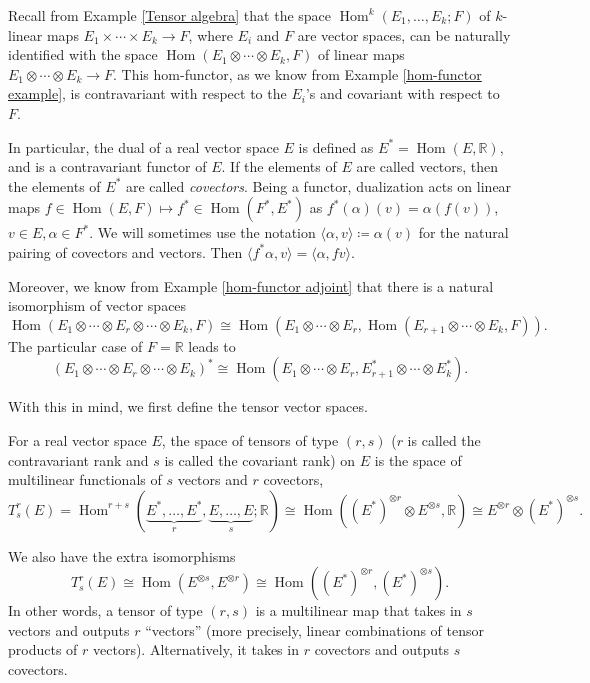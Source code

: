 \documentclass[english,letterpaper]{article}%
\numberwithin{equation}{section}
\numberwithin{figure}{section}
\numberwithin{table}{section}
\theoremstyle{definition}
\theoremstyle{definition}
\theoremstyle{definition}
\theoremstyle{plain}
\theoremstyle{plain}
\theoremstyle{plain}
\theoremstyle{plain}
\theoremstyle{remark}
\theoremstyle{remark}
\DeclareMathOperator{\Hom}{Hom}
\begin{document}
Recall from Example \ref{Tensor algebra} that the space $\Hom^k(E_1,\ldots,E_k;F)$ of $k$-linear maps $E_1\times \cdots\times E_k\to F$, where $E_i$ and $F$ are vector spaces, can be naturally identified with the space $\Hom(E_1\otimes\cdots\otimes E_k,F)$ of linear maps $E_1\otimes \cdots\otimes E_k\to F$. This hom-functor, as we know from Example \ref{hom-functor example}, is contravariant with respect to the $E_i$'s and covariant with respect to $F$. 

In particular, the dual of a real vector space $E$ is defined as $E^\ast=\Hom(E,\mathbb{R})$, and is a contravariant functor of $E$. If the elements of $E$ are called vectors, then the elements of $E^\ast$ are called \emph{covectors}. Being a functor, dualization acts on linear maps $f\in\Hom(E,F)\mapsto f^\ast\in \Hom(F^\ast,E^\ast)$ as $f^\ast(\alpha)(v)=\alpha(f(v))$, $v\in E, \alpha\in F^\ast$. We will sometimes use the notation $\langle \alpha,v\rangle\coloneqq\alpha(v)$ for the natural pairing of covectors and vectors. Then  $\langle f^\ast \alpha,v\rangle=\langle \alpha,fv\rangle$.

Moreover, we know from Example \ref{hom-functor adjoint} that there is a natural isomorphism of vector spaces
\[
\Hom(E_1\otimes\cdots\otimes E_r\otimes\cdots\otimes E_k,F)\cong\Hom\left(E_1\otimes\cdots\otimes E_r,\Hom(E_{r+1}\otimes\cdots\otimes E_k,F)\right).
\]
The particular case of $F=\mathbb{R}$ leads to 
\[
(E_1\otimes\cdots\otimes E_r\otimes\cdots\otimes E_k)^\ast\cong\Hom(E_1\otimes\cdots\otimes E_r,E_{r+1}^\ast\otimes\cdots\otimes E_k^\ast).
\]

With this in mind, we first define the tensor vector spaces.

\begin{defn}[Tensors]
    For a real vector space $E$, the space of tensors of type $(r,s)$ ($r$ is called the contravariant rank and $s$ is called the covariant rank) on $E$ is the space of multilinear functionals of $s$ vectors and $r$ covectors, \[T^r_s(E)=\Hom^{r+s}(\underbrace{E^\ast,\ldots,E^\ast}_{r},\underbrace{E,\ldots,E}_s;\mathbb{R})\cong\Hom \left(\left(E^\ast\right)^{\otimes r}\otimes E^{\otimes s},\mathbb{R}\right)\cong E^{\otimes r}\otimes \left(E^\ast\right)^{\otimes s}.\]
\end{defn}

We also have the extra isomorphisms
\[
T^r_s(E)\cong \Hom(E^{\otimes s},E^{\otimes r})\cong \Hom\left(\left(E^\ast\right)^{\otimes r},\left(E^\ast\right)^{\otimes s}\right).
\]
In other words, a tensor of type $(r,s)$ is a multilinear map that takes in $s$ vectors and outputs $r$ ``vectors'' (more precisely, linear combinations of tensor products of $r$ vectors). Alternatively, it takes in $r$ covectors and outputs $s$ covectors.
\end{document}
